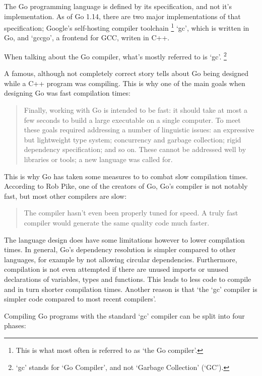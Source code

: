 The Go programming language is defined by its specification\autocite{go-spec}, and not
it's implementation. As of Go 1.14, there are two major implementations of that
specification; Google's self-hosting compiler toolchain
\footnote{This is what most often is referred to as `the Go compiler'.}
`gc', which is written in Go, and `gccgo', a frontend for GCC, writen in C++.

When talking about the Go compiler, what's mostly referred to is `gc'. \footnote{`gc' stands
for `Go Compiler', and not `Garbage Collection' (`GC').}

A famous, although not completely correct story tells about Go being designed
while a C++ program was compiling\autocite{less-is-more}.
This is why one of the main goals when designing Go was fast compilation times:
\begin{quote}
    Finally, working with Go is intended to be fast: it should take at most a few
    seconds to build a large executable on a single computer. To meet these goals
    required addressing a number of linguistic issues: an expressive but lightweight
    type system; concurrency and garbage collection; rigid dependency specification;
    and so on. These cannot be addressed well by libraries or tools; a new language
    was called for.\autocite{go-faq}
\end{quote}

This is why Go has taken some measures to to combat slow compilation times. According
to Rob Pike, one of the creators of Go, Go's compiler is not notably fast, but
most other compilers are slow:

\begin{quote}
    The compiler hasn't even been properly tuned for speed. A truly fast compiler
    would generate the same quality code much faster.\autocite{nuts-compiler}
\end{quote}

The language design does have some limitations
however to lower compilation times. In general, Go's dependency resolution is simpler
compared to other languages, for example by not allowing circular dependencies.
Furthermore, compilation is not even attempted if there are unused
imports or unused declarations of variables, types and functions.
This leads to less code to compile and in turn shorter compilation times.
Another reason is that `the `gc' compiler is simpler code compared to most
recent compilers'\autocite{nuts-compiler}.

Compiling Go programs with the standard `gc' compiler can be split into four
phases:

